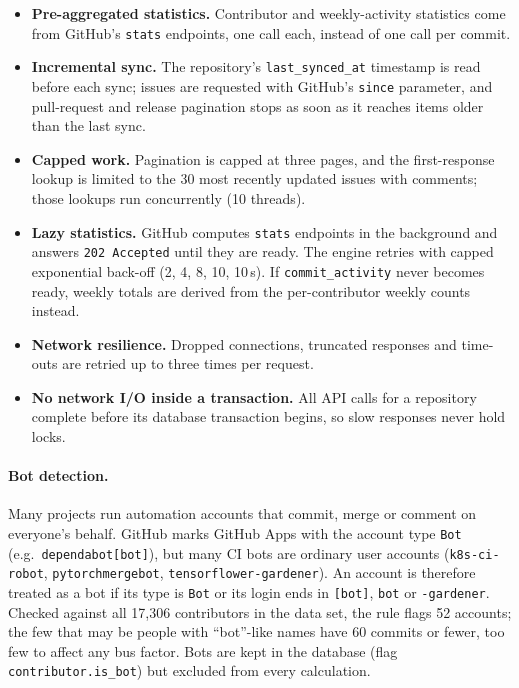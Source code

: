 \documentclass[11pt,a4paper]{report}
\begin{document}
\begin{itemize}
  \item \textbf{Pre-aggregated statistics.} Contributor and weekly-activity
        statistics come from GitHub's \texttt{stats} endpoints, one call each,
        instead of one call per commit.
  \item \textbf{Incremental sync.} The repository's \texttt{last\_synced\_at}
        timestamp is read before each sync; issues are requested with GitHub's
        \texttt{since} parameter, and pull-request and release pagination stops
        as soon as it reaches items older than the last sync.
  \item \textbf{Capped work.} Pagination is capped at three pages, and the
        first-response lookup is limited to the 30 most recently updated
        issues with comments; those lookups run concurrently (10 threads).
  \item \textbf{Lazy statistics.} GitHub computes \texttt{stats} endpoints in the
        background and answers \texttt{202 Accepted} until they are ready. The
        engine retries with capped exponential back-off (2, 4, 8, 10, 10\,s).
        If \texttt{commit\_activity} never becomes ready, weekly totals are
        derived from the per-contributor weekly counts instead.
  \item \textbf{Network resilience.} Dropped connections, truncated responses
        and time-outs are retried up to three times per request.
  \item \textbf{No network I/O inside a transaction.} All API calls for a
        repository complete before its database transaction begins, so slow
        responses never hold locks.
\end{itemize}

\paragraph{Bot detection.} Many projects run automation accounts that commit,
merge or comment on everyone's behalf. GitHub marks GitHub Apps with the account
type \texttt{Bot} (e.g.\ \nolinkurl{dependabot[bot]}), but many CI bots are
ordinary user accounts (\nolinkurl{k8s-ci-robot}, \nolinkurl{pytorchmergebot},
\nolinkurl{tensorflower-gardener}). An account is therefore treated as a bot if
its type is \texttt{Bot} or its login ends in \texttt{[bot]}, \texttt{bot} or
\texttt{-gardener}. Checked against all 17,306 contributors in the data set,
the rule flags 52 accounts; the few that may be people with ``bot''-like names
have 60 commits or fewer, too few to affect any bus factor. Bots are kept in the
database (flag \texttt{contributor.is\_bot}) but excluded from every
calculation.
\end{document}
